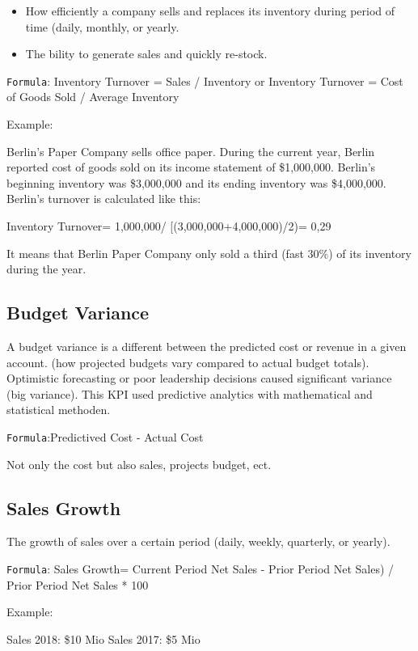 \documentclass[]{book}
\providecommand{\tightlist}{%
  \setlength{\itemsep}{0pt}\setlength{\parskip}{0pt}}
\begin{document}
\begin{itemize}
\tightlist
\item
  How efficiently a company sells and replaces its inventory during
  period of time (daily, monthly, or yearly.
\item
  The bility to generate sales and quickly re-stock.
\end{itemize}

\texttt{Formula}: Inventory Turnover = Sales / Inventory or Inventory
Turnover = Cost of Goods Sold / Average Inventory

Example:

Berlin's Paper Company sells office paper. During the current year,
Berlin reported cost of goods sold on its income statement of
\$1,000,000. Berlin's beginning inventory was \$3,000,000 and its ending
inventory was \$4,000,000. Berlin's turnover is calculated like this:

Inventory Turnover= 1,000,000/ {[}(3,000,000+4,000,000)/2)= 0,29

It means that Berlin Paper Company only sold a third (fast 30\%) of its
inventory during the year.

\subsection{Budget Variance}\label{budget-variance}

A budget variance is a different between the predicted cost or revenue
in a given account. (how projected budgets vary compared to actual
budget totals). Optimistic forecasting or poor leadership decisions
caused significant variance (big variance). This KPI used predictive
analytics with mathematical and statistical methoden.

\texttt{Formula}:Predictived Cost - Actual Cost

Not only the cost but also sales, projects budget, ect.

\subsection{Sales Growth}\label{sales-growth}

The growth of sales over a certain period (daily, weekly, quarterly, or
yearly).

\texttt{Formula}: Sales Growth= Current Period Net Sales - Prior Period
Net Sales) / Prior Period Net Sales * 100

Example:

Sales 2018: \$10 Mio Sales 2017: \$5 Mio
\end{document}
